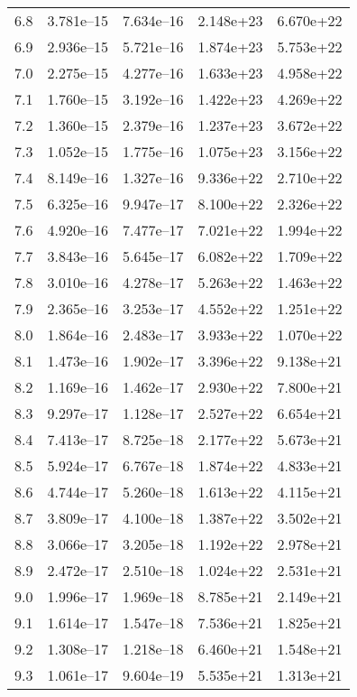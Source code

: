\documentclass[a4paper,fleqn,usenatbib]{mnras}
\begin{document}
\begin{table*}
\begin{tabular}{ccccc}
    6.8 & 3.781e--15 & 7.634e--16 & 2.148e+23 & 6.670e+22 \\
    6.9 & 2.936e--15 & 5.721e--16 & 1.874e+23 & 5.753e+22 \\
    7.0 & 2.275e--15 & 4.277e--16 & 1.633e+23 & 4.958e+22 \\
    7.1 & 1.760e--15 & 3.192e--16 & 1.422e+23 & 4.269e+22 \\
    7.2 & 1.360e--15 & 2.379e--16 & 1.237e+23 & 3.672e+22 \\
    7.3 & 1.052e--15 & 1.775e--16 & 1.075e+23 & 3.156e+22 \\
    7.4 & 8.149e--16 & 1.327e--16 & 9.336e+22 & 2.710e+22 \\
    7.5 & 6.325e--16 & 9.947e--17 & 8.100e+22 & 2.326e+22 \\
    7.6 & 4.920e--16 & 7.477e--17 & 7.021e+22 & 1.994e+22 \\
    7.7 & 3.843e--16 & 5.645e--17 & 6.082e+22 & 1.709e+22 \\
    7.8 & 3.010e--16 & 4.278e--17 & 5.263e+22 & 1.463e+22 \\
    7.9 & 2.365e--16 & 3.253e--17 & 4.552e+22 & 1.251e+22 \\
    8.0 & 1.864e--16 & 2.483e--17 & 3.933e+22 & 1.070e+22 \\
    8.1 & 1.473e--16 & 1.902e--17 & 3.396e+22 & 9.138e+21 \\
    8.2 & 1.169e--16 & 1.462e--17 & 2.930e+22 & 7.800e+21 \\
    8.3 & 9.297e--17 & 1.128e--17 & 2.527e+22 & 6.654e+21 \\
    8.4 & 7.413e--17 & 8.725e--18 & 2.177e+22 & 5.673e+21 \\
    8.5 & 5.924e--17 & 6.767e--18 & 1.874e+22 & 4.833e+21 \\
    8.6 & 4.744e--17 & 5.260e--18 & 1.613e+22 & 4.115e+21 \\
    8.7 & 3.809e--17 & 4.100e--18 & 1.387e+22 & 3.502e+21 \\
    8.8 & 3.066e--17 & 3.205e--18 & 1.192e+22 & 2.978e+21 \\
    8.9 & 2.472e--17 & 2.510e--18 & 1.024e+22 & 2.531e+21 \\
    9.0 & 1.996e--17 & 1.969e--18 & 8.785e+21 & 2.149e+21 \\
    9.1 & 1.614e--17 & 1.547e--18 & 7.536e+21 & 1.825e+21 \\
    9.2 & 1.308e--17 & 1.218e--18 & 6.460e+21 & 1.548e+21 \\
    9.3 & 1.061e--17 & 9.604e--19 & 5.535e+21 & 1.313e+21 \\

\end{tabular}
\end{table*}
\end{document}
